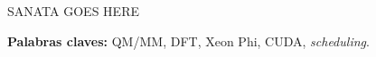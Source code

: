 
\noindent SANATA GOES HERE

\bigskip

\noindent\textbf{Palabras claves:} QM/MM, DFT, Xeon Phi, CUDA, \textit{scheduling}.
